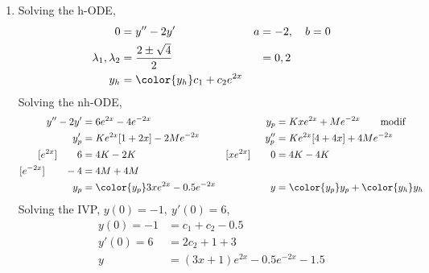 \begin{enumerate}
    \item Solving the h-ODE,
          \begin{align}
              0                        & = y'' - 2y'                       & a & = -2, \quad b = 0 \\
              \lambda_{1}, \lambda_{2} & = \frac{2 \pm \sqrt{4}}{2}        &   & = 0, 2            \\
              y_{h}                    & = \color{y_h} c_{1} + c_{2}e^{2x}
          \end{align}
          Solving the nh-ODE,
          \begin{align}
              y'' - 2y'           & = 6e^{2x} - 4e^{-2x}                & y_{p}              & = Kxe^{2x} + Me^{-2x} \qquad \text{modif}   \\
              y_{p}'              & = Ke^{2x}[1 + 2x] - 2Me^{-2x}       & y_{p}''            & = Ke^{2x}[4 + 4x] + 4Me^{-2x}               \\
              [e^{2x}] \qquad 6   & = 4K  - 2K                          & [xe^{2x}] \qquad 0 & = 4K - 4K                                   \\
              [e^{-2x}] \qquad -4 & = 4M + 4M                                                                                              \\
              y_{p}               & = \color{y_p} 3xe^{2x} - 0.5e^{-2x} & y                  & = {\color{y_p} y_{p}} + {\color{y_h} y_{h}}
          \end{align}
          Solving the IVP, $ y(0) = -1,\ y'(0) = 6 $,
          \begin{align}
              y(0) = -1 & = c_{1} + c_{2} - 0.5                \\
              y'(0) = 6 & = 2c_{2} + 1 + 3                     \\
              y         & = (3x + 1)e^{2x} - 0.5e^{-2x}  - 1.5
          \end{align}


\end{enumerate}
